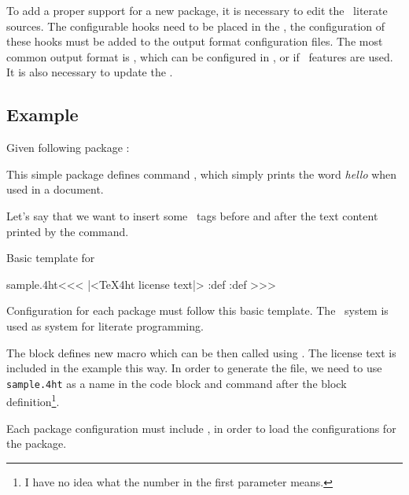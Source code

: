 \documentclass{book}
\begin{document}
To add a proper support for a new package, it is necessary to edit the 
\texfourht\ literate sources. The configurable hooks need to be placed in the ,
the configuration of these hooks must be added to the output format configuration files.
The most common output format is \HTML, which can be configured in , or 
 if \HTMLV\ features are used. It is also necessary to update the
.

\subsection{Example}

Given following package :


This simple package defines command \texcommand{\hello}, which simply prints the word \textit{hello} when used in a document.

Let's say that we want to insert some \HTML\ tags before and after the text content printed by the command.

Basic template for 

\begin{texsource}
\<sample.4ht\><<<
|<TeX4ht license text|>
\pend:def
\append:def
>>> 
\end{texsource}

Configuration for each package must follow this basic template. The \ProTeX\ system is used as system for literate programming.

The  block defines new macro which can be then called using . The license text
is included in the example this way. In order to generate the  file, we need to use \texttt{sample.4ht} as a name
in the code block and command  after the block definition\footnote{I have no idea what the number
in the first parameter means.}.

Each package configuration  must include , in order to load the configurations for the package.
\end{document}
